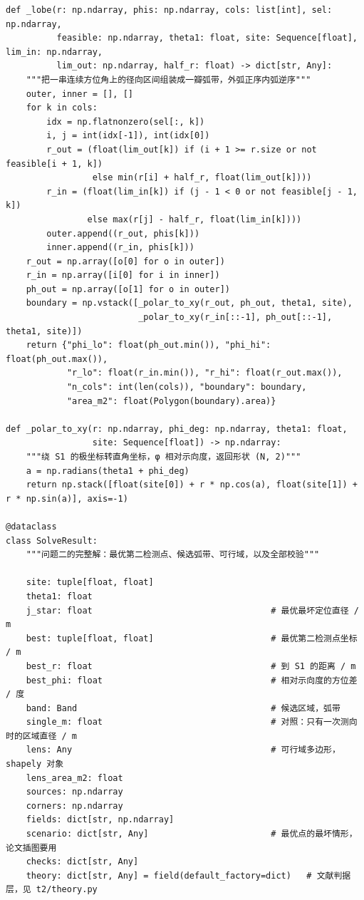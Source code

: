 \documentclass[UTF8, zihao=5,AutoFakeBold=2]{ctexart}
\begin{document}
\begin{lstlisting}
def _lobe(r: np.ndarray, phis: np.ndarray, cols: list[int], sel: np.ndarray,
          feasible: np.ndarray, theta1: float, site: Sequence[float], lim_in: np.ndarray,
          lim_out: np.ndarray, half_r: float) -> dict[str, Any]:
    """把一串连续方位角上的径向区间组装成一瓣弧带，外弧正序内弧逆序"""
    outer, inner = [], []
    for k in cols:
        idx = np.flatnonzero(sel[:, k])
        i, j = int(idx[-1]), int(idx[0])
        r_out = (float(lim_out[k]) if (i + 1 >= r.size or not feasible[i + 1, k])
                 else min(r[i] + half_r, float(lim_out[k])))
        r_in = (float(lim_in[k]) if (j - 1 < 0 or not feasible[j - 1, k])
                else max(r[j] - half_r, float(lim_in[k])))
        outer.append((r_out, phis[k]))
        inner.append((r_in, phis[k]))
    r_out = np.array([o[0] for o in outer])
    r_in = np.array([i[0] for i in inner])
    ph_out = np.array([o[1] for o in outer])
    boundary = np.vstack([_polar_to_xy(r_out, ph_out, theta1, site),
                          _polar_to_xy(r_in[::-1], ph_out[::-1], theta1, site)])
    return {"phi_lo": float(ph_out.min()), "phi_hi": float(ph_out.max()),
            "r_lo": float(r_in.min()), "r_hi": float(r_out.max()),
            "n_cols": int(len(cols)), "boundary": boundary,
            "area_m2": float(Polygon(boundary).area)}

def _polar_to_xy(r: np.ndarray, phi_deg: np.ndarray, theta1: float,
                 site: Sequence[float]) -> np.ndarray:
    """绕 S1 的极坐标转直角坐标，φ 相对示向度，返回形状 (N, 2)"""
    a = np.radians(theta1 + phi_deg)
    return np.stack([float(site[0]) + r * np.cos(a), float(site[1]) + r * np.sin(a)], axis=-1)

@dataclass
class SolveResult:
    """问题二的完整解：最优第二检测点、候选弧带、可行域，以及全部校验"""

    site: tuple[float, float]
    theta1: float
    j_star: float                                   # 最优最坏定位直径 / m
    best: tuple[float, float]                       # 最优第二检测点坐标 / m
    best_r: float                                   # 到 S1 的距离 / m
    best_phi: float                                 # 相对示向度的方位差 / 度
    band: Band                                      # 候选区域，弧带
    single_m: float                                 # 对照：只有一次测向时的区域直径 / m
    lens: Any                                       # 可行域多边形，shapely 对象
    lens_area_m2: float
    sources: np.ndarray
    corners: np.ndarray
    fields: dict[str, np.ndarray]
    scenario: dict[str, Any]                        # 最优点的最坏情形，论文插图要用
    checks: dict[str, Any]
    theory: dict[str, Any] = field(default_factory=dict)   # 文献判据层，见 t2/theory.py


\end{lstlisting}
\end{document}
